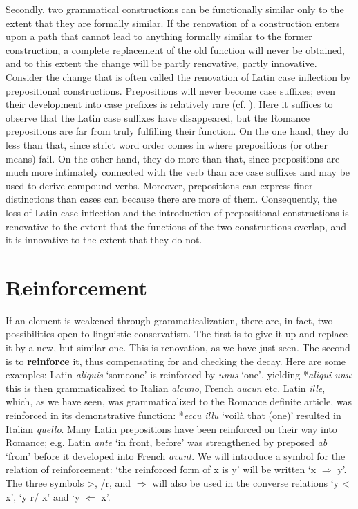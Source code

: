 Secondly, two grammatical constructions can be functionally similar only to the extent that they are formally similar. If the renovation of a construction enters upon a path that cannot lead to anything formally similar to the former construction, a complete replacement of the old function will never be obtained, and to this extent the change will be partly renovative, partly innovative. Consider the change that is often called the renovation of Latin case inflection by prepositional constructions. Prepositions will never become case suffixes; even their development into case prefixes is relatively rare (cf. ). Here it suffices to observe that the Latin case suffixes have disappeared, but the Romance prepositions are far from truly fulfilling their function. On the one hand, they do less than that, since strict word order comes in where prepositions (or other means) fail. On the other hand, they do more than that, since prepositions are much more intimately connected with the verb than are case suffixes and may be used to derive compound verbs. Moreover, prepositions can express finer distinctions than cases can because there are more of them. Consequently, the loss of Latin case inflection and the introduction of prepositional constructions is renovative to the extent that the functions of the two constructions overlap, and it is innovative to the extent that they do not.

\section{Reinforcement}

If an element is weakened through grammaticalization, there are, in fact, two possibilities open to linguistic conservatism. The first is to give it up and replace it by a new, but similar one. This is renovation, as we have just seen. The second is to \textbf{reinforce} it, thus compensating for and checking the decay. Here are some examples: Latin \textit{aliquis} ‘someone’ is reinforced by \textit{unus} ‘one’, yielding *\textit{aliqui-unu}; this is then grammaticalized to Italian \textit{alcuno}, French \textit{aucun} etc. Latin \textit{ille}, which, as we have seen, was grammaticalized to the Romance definite article, was reinforced in its demonstrative function: *\textit{eccu illu} ‘voilà that (one)’ resulted in Italian \textit{quello}. Many Latin prepositions have been reinforced on their way into Romance; e.g. Latin \textit{ante} ‘in front, before’ was strengthened by preposed \textit{ab} ‘from’ before it developed into French \textit{avant}. We will introduce a symbol for the relation of reinforcement: ‘the reinforced form of x is y’ will be written ‘x $\Rightarrow $ y’. The three symbols {\textgreater}, /r, and $\Rightarrow $ will also be used in the converse relations ‘y {\textless} x’, ‘y r/ x’ and ‘y $\Leftarrow $ x’.

